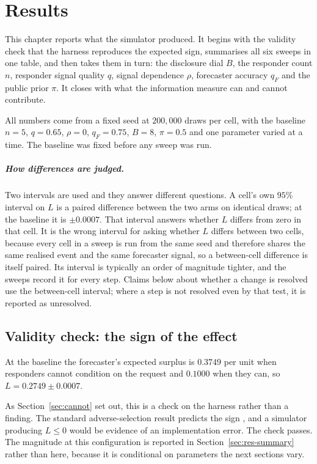 \chapter{Results}
\label{ch:results}

This chapter reports what the simulator produced. It begins with the validity check that the
harness reproduces the expected sign, summarises all six sweeps in one table, and then takes
them in turn: the disclosure dial $B$, the responder count $n$, responder signal quality $q$,
signal dependence $\rho$, forecaster accuracy $q_F$ and the public prior $\pi$. It closes with
what the information measure can and cannot contribute.

All numbers come from a fixed seed at $200{,}000$ draws per cell, with the baseline
$n=5$, $q=0.65$, $\rho=0$, $q_F=0.75$, $B=8$, $\pi=0.5$ and one parameter varied at a time.
The baseline was fixed before any sweep was run.

\paragraph{How differences are judged.} Two intervals are used and they answer different
questions. A cell's own $95\%$ interval on $L$ is a paired difference between the two arms
on identical draws; at the baseline it is $\pm 0.0007$. That interval answers whether $L$
differs from zero in that cell. It is the wrong interval for asking whether $L$ differs
between two cells, because every cell in a sweep is run from the same seed and therefore
shares the same realised event and the same forecaster signal, so a between-cell difference
is itself paired. Its interval is typically an order of magnitude tighter, and the sweeps
record it for every step. Claims below about whether a change is resolved use the
between-cell interval; where a step is not resolved even by that test, it is reported as
unresolved.

\section{Validity check: the sign of the effect}
\label{sec:validity}

At the baseline the forecaster's expected surplus is $0.3749$ per unit when responders
cannot condition on the request and $0.1000$ when they can, so $L = 0.2749 \pm 0.0007$.

As Section~\ref{sec:cannot} set out, this is a check on the harness rather than a finding.
The standard adverse-selection result predicts the sign \cite{glosten1985bidask,
kyle1985continuous}, and a simulator producing $L \le 0$ would be evidence of an
implementation error. The check passes. The magnitude at this configuration is reported in
Section~\ref{sec:res-summary} rather than here, because it is conditional on parameters the
next sections vary.

